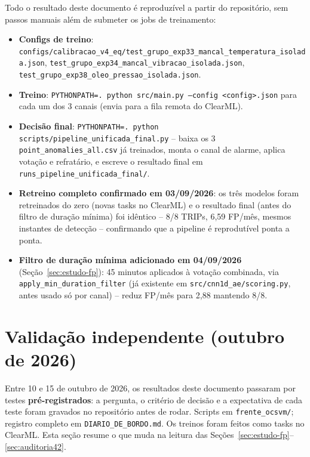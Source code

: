 \documentclass[11pt,a4paper]{article}
\begin{document}
Todo o resultado deste documento é reproduzível a partir do
repositório, sem passos manuais além de submeter os jobs de
treinamento:

\begin{itemize}
  \item \textbf{Configs de treino}:
    \texttt{configs/calibracao\_v4\_eq/test\_grupo\_exp33\_mancal\_temperatura\_isolada.json},
    \texttt{test\_grupo\_exp34\_mancal\_vibracao\_isolada.json},
    \texttt{test\_grupo\_exp38\_oleo\_pressao\_isolada.json}.
  \item \textbf{Treino}: \texttt{PYTHONPATH=. python src/main.py --config <config>.json}
    para cada um dos 3 canais (envia para a fila remota do ClearML).
  \item \textbf{Decisão final}: \texttt{PYTHONPATH=. python
    scripts/pipeline\_unificada\_final.py} -- baixa os 3
    \texttt{point\_anomalies\_all.csv} já treinados, monta o canal de
    alarme, aplica votação e refratário, e escreve o resultado final
    em \texttt{runs\_pipeline\_unificada\_final/}.
  \item \textbf{Retreino completo confirmado em 03/09/2026}: os três
    modelos foram retreinados do zero (novas tasks no ClearML) e o
    resultado final (antes do filtro de duração mínima) foi idêntico
    -- 8/8 TRIPs, 6,59 FP/mês, mesmos instantes de detecção --
    confirmando que a pipeline é reprodutível ponta a ponta.
  \item \textbf{Filtro de duração mínima adicionado em 04/09/2026}
    (Seção~\ref{sec:estudo-fp}): 45 minutos aplicados à votação
    combinada, via \texttt{apply\_min\_duration\_filter} (já existente
    em \texttt{src/cnn1d\_ae/scoring.py}, antes usado só por canal) --
    reduz FP/mês para 2,88 mantendo 8/8.
\end{itemize}

\clearpage
\section{Validação independente (outubro de 2026)}
\label{sec:validacao}

Entre 10 e 15 de outubro de 2026, os resultados deste documento
passaram por testes \textbf{pré-registrados}: a pergunta, o critério
de decisão e a expectativa de cada teste foram gravados no
repositório antes de rodar. Scripts em \texttt{frente\_ocsvm/};
registro completo em \texttt{DIARIO\_DE\_BORDO.md}. Os treinos foram
feitos como tasks no ClearML. Esta seção resume o que muda na leitura
das Seções~\ref{sec:estudo-fp}--\ref{sec:auditoria42}.
\end{document}
